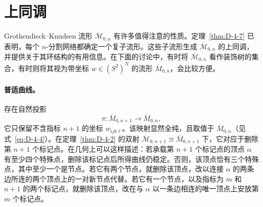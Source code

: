 
\section{上同调}\label{sec:D-6}

Grothendieck--Knudsen 流形 $\overline{\mathcal M}_{0,n}$ 有许多值得注意的性质。定理~\ref{thm:D-4-7} 已表明，每个 $n$-分割网络都确定一个复子流形。这些子流形生成 $\overline{\mathcal M}_{0,n}$ 的上同调，并提供关于其环结构的有用信息。在下面的讨论中，有时将 $\overline{\mathcal M}_{0,n}$ 看作装饰树的集合，有时则将其视为带坐标 $w\in(S^2)^N$ 的流形 $\overline M_{0,n}$，会比较方便。

\paragraph{普适曲线。}
存在自然投影
\begin{equation}\label{eq:D-6-1}
  \pi:\overline M_{0,n+1}\longrightarrow\overline M_{0,n},
\end{equation}
它只保留不含指标 $n+1$ 的坐标 $w_{ijk\ell}$。该映射显然全纯，且取值于 $\overline M_{0,n}$（见式~\eqref{eq:D-4-4}）。在定理~\ref{thm:D-4-2} 的双射 $\overline{\mathcal M}_{0,n+1}\cong\overline M_{0,n+1}$ 下，它对应于删除第 $n+1$ 个标记点。在几何上可以这样描述：若承载第 $n+1$ 个标记点的顶点 $\alpha$ 有至少四个特殊点，删除该标记点后所得曲线仍稳定。否则，该顶点恰有三个特殊点，其中至少一个是节点。若它有两个节点，就删除该顶点，改以连接 $\alpha$ 的两条边所连的两个顶点上的一对新节点代替。若它有一个节点，以及指标为 $m$ 和 $n+1$ 的两个标记点，就删除该顶点，改在与 $\alpha$ 以一条边相连的唯一顶点上安放第 $m$ 个标记点。

